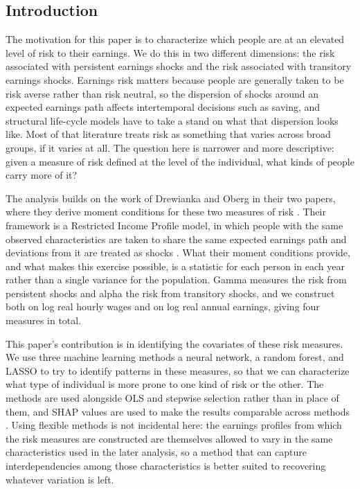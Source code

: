 \documentclass[12pt]{article}
\begin{document}
\begin{onehalfspace}

\section{Introduction}

The motivation for this paper is to characterize which people are at an elevated level of risk to their earnings. We do this in two different dimensions: the risk associated with persistent earnings shocks and the risk associated with transitory earnings shocks. Earnings risk matters because people are generally taken to be risk averse rather than risk neutral, so the dispersion of shocks around an expected earnings path affects intertemporal decisions such as saving, and structural life-cycle models have to take a stand on what that dispersion looks like. Most of that literature treats risk as something that varies across broad groups, if it varies at all. The question here is narrower and more descriptive: given a measure of risk defined at the level of the individual, what kinds of people carry more of it?

The analysis builds on the work of Drewianka and Oberg in their two papers, where they derive moment conditions for these two measures of risk \cite{drewianka2025,drewianka_oberg2019}. Their framework is a Restricted Income Profile model, in which people with the same observed characteristics are taken to share the same expected earnings path and deviations from it are treated as shocks \cite{abowd_card1989,meghir_pistaferri2004}. What their moment conditions provide, and what makes this exercise possible, is a statistic for each person in each year rather than a single variance for the population. Gamma measures the risk from persistent shocks and alpha the risk from transitory shocks, and we construct both on log real hourly wages and on log real annual earnings, giving four measures in total.

This paper's contribution is in identifying the covariates of these risk measures. We use three machine learning methods a neural network, a random forest, and LASSO to try to identify patterns in these measures, so that we can characterize what type of individual is more prone to one kind of risk or the other. The methods are used alongside OLS and stepwise selection rather than in place of them, and SHAP values are used to make the results comparable across methods \cite{lundberq}. Using flexible methods is not incidental here: the earnings profiles from which the risk measures are constructed are themselves allowed to vary in the same characteristics used in the later analysis, so a method that can capture interdependencies among those characteristics is better suited to recovering whatever variation is left.


\end{onehalfspace}
\end{document}
